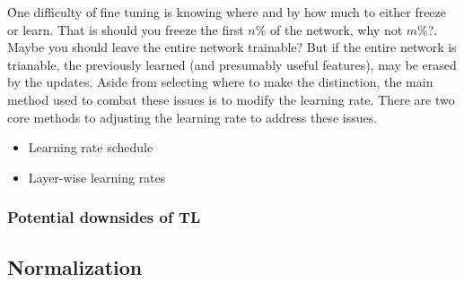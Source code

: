 

\r{One difficulty of fine tuning is knowing where and by how much to either freeze or learn. That is should you freeze the first $n\%$ of the network, why not $m\%$?. Maybe you should leave the entire network trainable? But if the entire network is trianable, the previously learned (and presumably useful features), may be erased by the updates. Aside from selecting where to make the distinction, the main method used to combat these issues is to modify the learning rate. There are two core methods to adjusting the learning rate to address these issues.}

\begin{itemize}[noitemsep,topsep=0pt]
	\item Learning rate schedule
	\item Layer-wise learning rates
\end{itemize}





\subsubsection{Potential downsides of TL}



\subsection{Normalization}




